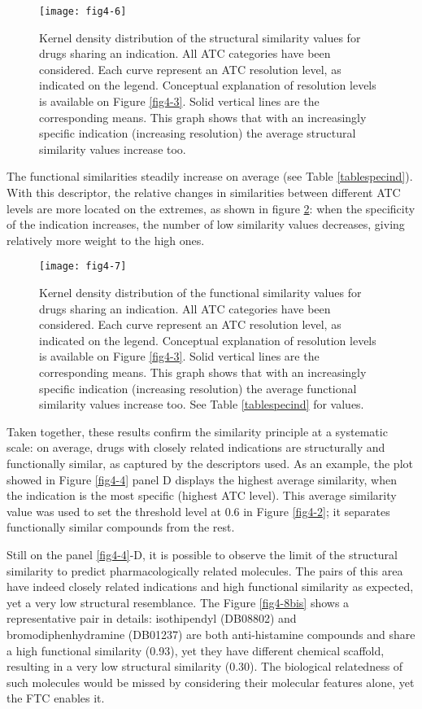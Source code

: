 \begin{figure}[H]
    \centering
    \texttt{[image: fig4-6]}
    \caption{Kernel density distribution of the structural similarity values for drugs sharing an indication. All ATC categories have been considered. Each curve represent an ATC resolution level, as indicated on the legend. Conceptual explanation of resolution levels is available on Figure \ref{fig4-3}. Solid vertical lines are the corresponding means. This graph shows that with an increasingly specific indication (increasing resolution) the average structural similarity values increase too.}
    \label{fig4-6}
\end{figure}

The functional similarities steadily increase on average (see Table \ref{tablespecind}). With this descriptor, the relative changes in similarities between different ATC levels are more located on the extremes, as shown in figure \ref{fig4-7}: when the specificity of the indication increases, the number of low similarity values decreases, giving relatively more weight to the high ones.

\begin{figure}[H]
    \centering
    \texttt{[image: fig4-7]}
    \caption{Kernel density distribution of the functional similarity values for drugs sharing an indication. All ATC categories have been considered. Each curve represent an ATC resolution level, as indicated on the legend. Conceptual explanation of resolution levels is available on Figure \ref{fig4-3}. Solid vertical lines are the corresponding means. This graph shows that with an increasingly specific indication (increasing resolution) the average functional similarity values increase too. See Table \ref{tablespecind} for values.}
    \label{fig4-7}
\end{figure}

Taken together, these results confirm the similarity principle at a systematic scale: on average, drugs with closely related indications are structurally and functionally similar, as captured by the descriptors used. As an example, the plot showed in Figure \ref{fig4-4} panel D displays the highest average similarity, when the indication is the most specific (highest ATC level). This average similarity value was used to set the threshold level at 0.6 in Figure \ref{fig4-2}; it separates functionally similar compounds from the rest.

Still on the panel \ref{fig4-4}-D, it is possible to observe the limit of the structural similarity to predict pharmacologically related molecules. The pairs of this area have indeed closely related indications and high functional similarity as expected, yet a very low structural resemblance. The Figure \ref{fig4-8bis} shows a representative pair in details: isothipendyl (DB08802) and bromodiphenhydramine (DB01237) are both anti-histamine compounds and share a high functional similarity (0.93), yet they have different chemical scaffold, resulting in a very low structural similarity (0.30). The biological relatedness of such molecules would be missed by considering their molecular features alone, yet the FTC enables it.

